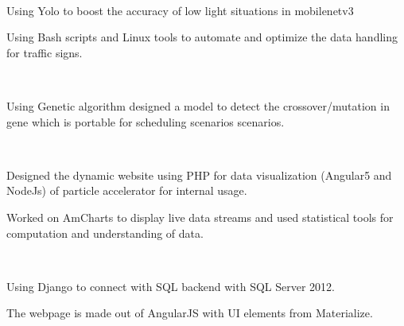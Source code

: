 \documentclass{article}
\begin{document}
\begin{minipage}[t]{0.66\textwidth} 


 \\
\vspace{\topsep} %
\begin{tightemize}
\item Using Yolo to boost the accuracy of low light situations in mobilenetv3 
\item Using Bash scripts and Linux tools to automate and optimize the data handling for traffic signs.
\end{tightemize}
\sectionsep

 \\
\vspace{\topsep} %
\begin{tightemize}
\item Using Genetic algorithm designed a model to detect the crossover/mutation in gene which is portable for scheduling scenarios scenarios.
\end{tightemize}
\sectionsep

 \\
\vspace{\topsep} %
\begin{tightemize}
\item Designed the dynamic website using PHP for data visualization (Angular5 and NodeJs) of particle accelerator for internal usage.
\item Worked on AmCharts to display live data streams and used statistical tools for computation and understanding of data.
\end{tightemize}
\sectionsep

 \\
\vspace{\topsep} %
\begin{tightemize}
\item Using Django to connect with SQL backend with SQL Server 2012.
\item The webpage is made out of AngularJS with UI elements from Materialize.
\end{tightemize}
\sectionsep


\end{minipage}
\end{document}
